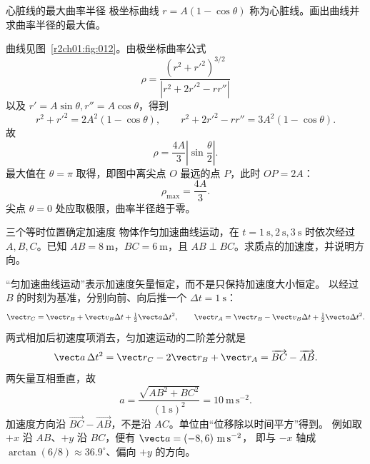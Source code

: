 \begin{practicebox}{心脏线的最大曲率半径}
极坐标曲线 $r=A(1-\cos\theta)$ 称为心脏线。画出曲线并求曲率半径的最大值。
\label{r2ch01:pr:005}
\begin{solution}
曲线见图~\ref{r2ch01:fig:012}。由极坐标曲率公式
\[
  \rho=\frac{(r^2+r'^2)^{3/2}}{|r^2+2r'^2-r r''|}
\]
以及 $r'=A\sin\theta, r''=A\cos\theta$，得到
\[
  r^2+r'^2=2A^2(1-\cos\theta),\qquad
  r^2+2r'^2-r r''=3A^2(1-\cos\theta).
\]
故
\[
  \rho=\frac{4A}{3}\left|\sin\frac\theta2\right|.
\]
最大值在 $\theta=\pi$ 取得，即图中离尖点 $O$ 最远的点 $P$，此时 $OP=2A$：
\[
  \boxed{\rho_{\max}=\frac{4A}{3}}.
\]
尖点 $\theta=0$ 处应取极限，曲率半径趋于零。

\figCardioid
\end{solution}
\end{practicebox}

\begin{practicebox}{三个等时位置确定加速度}
物体作匀加速曲线运动，在 $t=1\ \mathrm s,2\ \mathrm s,3\ \mathrm s$ 时依次经过 $A,B,C$。已知 $AB=8\ \mathrm m$，$BC=6\ \mathrm m$，且 $AB\perp BC$。求质点的加速度，并说明方向。
\label{r2ch01:pr:006}
\begin{solution}
“匀加速曲线运动”表示加速度矢量恒定，而不是只保持加速度大小恒定。
以经过 $B$ 的时刻为基准，分别向前、向后推一个 $\Delta t=1\ \mathrm s$：
\[
 \vect r_C=\vect r_B+\vect v_B\Delta t+\tfrac12\vect a\Delta t^2,
 \qquad
 \vect r_A=\vect r_B-\vect v_B\Delta t+\tfrac12\vect a\Delta t^2.
\]
两式相加后初速度项消去，匀加速运动的二阶差分就是
\[
  \vect a\,\Delta t^2=\vect r_C-2\vect r_B+\vect r_A
  =\overrightarrow{BC}-\overrightarrow{AB}.
\]
两矢量互相垂直，故
\[
  a=\frac{\sqrt{AB^2+BC^2}}{(1\ \mathrm s)^2}
  =\boxed{10\ \mathrm{m\,s^{-2}}}.
\]
加速度方向沿 $\overrightarrow{BC}-\overrightarrow{AB}$，不是沿 $AC$。单位由“位移除以时间平方”得到。
例如取 $+x$ 沿 $AB$、$+y$ 沿 $BC$，便有 $\vect a=(-8,6)\ \mathrm{m\,s^{-2}}$，
即与 $-x$ 轴成 $\arctan(6/8)\approx36.9^\circ$、偏向 $+y$ 的方向。
\end{solution}
\end{practicebox}

